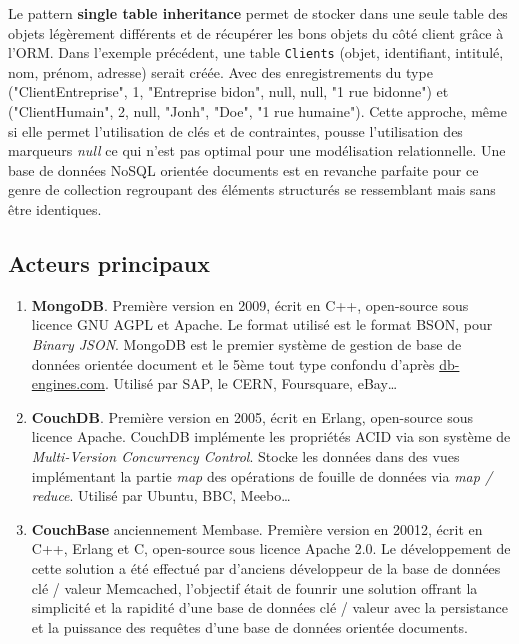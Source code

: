   Le pattern \textbf{single table inheritance} permet de stocker dans une seule table des objets légèrement différents et de récupérer les bons objets du côté client grâce à l'ORM. Dans l'exemple précédent, une table \texttt{Clients} (objet, identifiant, intitulé, nom, prénom, adresse) serait créée. Avec des enregistrements du type ("ClientEntreprise", 1, "Entreprise bidon", null, null, "1 rue bidonne") et ("ClientHumain", 2, null, "Jonh", "Doe", "1 rue humaine"). Cette approche, même si elle permet l'utilisation de clés et de contraintes, pousse l'utilisation des marqueurs \textit{null} ce qui n'est pas optimal pour une modélisation relationnelle. Une base de données NoSQL orientée documents est en revanche parfaite pour ce genre de collection regroupant des éléments structurés se ressemblant mais sans être identiques.

\subsection{Acteurs principaux}

  \begin{enumerate}
    \item \textbf{MongoDB}. Première version en 2009, écrit en C++, open-source sous licence GNU AGPL et Apache. Le format utilisé est le format BSON, pour \textit{Binary JSON}. MongoDB est le premier système de gestion de base de données orientée document et le 5ème tout type confondu d'après \url{db-engines.com}. Utilisé par SAP, le CERN, Foursquare, eBay\dots\cite{Wikipedia_mongodb}
    \item \textbf{CouchDB}. Première version en 2005, écrit en Erlang, open-source sous licence Apache. CouchDB implémente les propriétés ACID via son système de \textit{Multi-Version Concurrency Control}. Stocke les données dans des vues implémentant la partie \textit{map} des opérations de fouille de données via \textit{map / reduce}. Utilisé par Ubuntu, BBC, Meebo\dots\cite{Wikipedia_couchdb}
    \item \textbf{CouchBase} anciennement Membase. Première version en 20012, écrit en C++, Erlang et C, open-source sous licence Apache 2.0. Le développement de cette solution a été effectué par d'anciens développeur de la base de données clé / valeur Memcached, l'objectif était de founrir une solution offrant la simplicité et la rapidité d'une base de données clé / valeur avec la persistance et la puissance des requêtes d'une base de données orientée documents.\cite{Wikipedia_couchbase}
  \end{enumerate}
